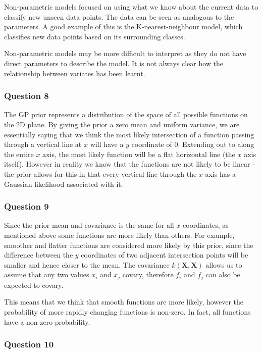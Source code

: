 \documentclass[10pt, a4paper, twocolumn]{article} %
\begin{document}
Non-parametric models focused on using what we know about the current data to classify new unseen data points. The data can be seen as analogous to the parameters. A good example of this is the K-nearest-neighbour model, which classifies new data points based on its surrounding classes. 

Non-parametric models may be more difficult to interpret as they do not have direct parameters to describe the model. It is not always clear how the relationship between variates has been learnt.

\subsubsection*{Question 8}

The GP prior represents a distribution of the space of all possible functions on the 2D plane. By giving the prior a zero mean and uniform variance, we are essentially saying that we think the most likely intersection of a function passing through a vertical line at $x$ will have a $y$ coordinate of 0. Extending out to along the entire $x$ axis, the most likely function will be a flat horizontal line (the $x$ axis itself). However in reality we know that the functions are not likely to be linear - the prior allows for this in that every vertical line through the $x$ axis has a Gaussian likelihood associated with it.

\subsubsection*{Question 9}

Since the prior mean and covariance is the same for all $x$ coordinates, as mentioned above some functions are more likely than others. For example, smoother and flatter functions are considered more likely by this prior, since the difference between the $y$ coordinates of two adjacent intersection points will be smaller and hence closer to the mean. The covariance $ k(\mathbf{X}, \mathbf{X})$ allows us to assume that any two values $x_i$ and $x_j$ covary, therefore $f_i$ and $f_j$ can also be expected to covary. 

This means that we think that smooth functions are more likely, however the probability of more rapidly changing functions is non-zero. In fact, all functions have a non-zero probability.

\subsubsection*{Question 10}
\end{document}

